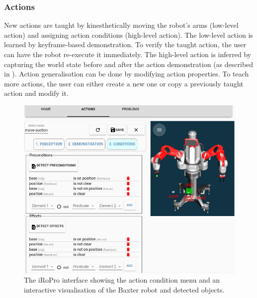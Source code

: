 \subsubsection*{Actions} New actions are taught by kinesthetically moving the robot's arms (low-level action) and assigning action conditions (high-level action).
The low-level action is learned %
by keyframe-based demonstration.
To verify the taught action, the user can have the robot re-execute it immediately.
The high-level action is inferred by capturing the world state before and after the action demonstration (as described in ).
Action generalisation can be done by modifying action properties.
To teach more actions, the user can either create a new one or copy a previously taught action and modify it.
\begin{figure}[h]
	\includegraphics[width=0.96\linewidth]{figures/gui.png}
	\caption{The iRoPro interface showing the action condition menu and an interactive visualisation of the Baxter robot and detected objects.}\label{fig:gui-action-3}%
\end{figure}

